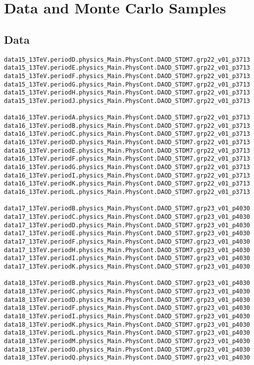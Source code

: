 \section{Data and Monte Carlo Samples}
\label{app:datasets}

\subsection{Data}
\begin{tiny}
\begin{verbatim}
data15_13TeV.periodD.physics_Main.PhysCont.DAOD_STDM7.grp22_v01_p3713
data15_13TeV.periodE.physics_Main.PhysCont.DAOD_STDM7.grp22_v01_p3713
data15_13TeV.periodF.physics_Main.PhysCont.DAOD_STDM7.grp22_v01_p3713
data15_13TeV.periodG.physics_Main.PhysCont.DAOD_STDM7.grp22_v01_p3713
data15_13TeV.periodH.physics_Main.PhysCont.DAOD_STDM7.grp22_v01_p3713
data15_13TeV.periodJ.physics_Main.PhysCont.DAOD_STDM7.grp22_v01_p3713

data16_13TeV.periodA.physics_Main.PhysCont.DAOD_STDM7.grp22_v01_p3713
data16_13TeV.periodB.physics_Main.PhysCont.DAOD_STDM7.grp22_v01_p3713
data16_13TeV.periodC.physics_Main.PhysCont.DAOD_STDM7.grp22_v01_p3713
data16_13TeV.periodD.physics_Main.PhysCont.DAOD_STDM7.grp22_v01_p3713
data16_13TeV.periodE.physics_Main.PhysCont.DAOD_STDM7.grp22_v01_p3713
data16_13TeV.periodF.physics_Main.PhysCont.DAOD_STDM7.grp22_v01_p3713
data16_13TeV.periodG.physics_Main.PhysCont.DAOD_STDM7.grp22_v01_p3713
data16_13TeV.periodI.physics_Main.PhysCont.DAOD_STDM7.grp22_v01_p3713
data16_13TeV.periodK.physics_Main.PhysCont.DAOD_STDM7.grp22_v01_p3713
data16_13TeV.periodL.physics_Main.PhysCont.DAOD_STDM7.grp22_v01_p3713

data17_13TeV.periodB.physics_Main.PhysCont.DAOD_STDM7.grp23_v01_p4030
data17_13TeV.periodC.physics_Main.PhysCont.DAOD_STDM7.grp23_v01_p4030
data17_13TeV.periodD.physics_Main.PhysCont.DAOD_STDM7.grp23_v01_p4030
data17_13TeV.periodE.physics_Main.PhysCont.DAOD_STDM7.grp23_v01_p4030
data17_13TeV.periodF.physics_Main.PhysCont.DAOD_STDM7.grp23_v01_p4030
data17_13TeV.periodH.physics_Main.PhysCont.DAOD_STDM7.grp23_v01_p4030
data17_13TeV.periodI.physics_Main.PhysCont.DAOD_STDM7.grp23_v01_p4030
data17_13TeV.periodK.physics_Main.PhysCont.DAOD_STDM7.grp23_v01_p4030

data18_13TeV.periodB.physics_Main.PhysCont.DAOD_STDM7.grp23_v01_p4030
data18_13TeV.periodC.physics_Main.PhysCont.DAOD_STDM7.grp23_v01_p4030
data18_13TeV.periodD.physics_Main.PhysCont.DAOD_STDM7.grp23_v01_p4030
data18_13TeV.periodF.physics_Main.PhysCont.DAOD_STDM7.grp23_v01_p4030
data18_13TeV.periodI.physics_Main.PhysCont.DAOD_STDM7.grp23_v01_p4030
data18_13TeV.periodK.physics_Main.PhysCont.DAOD_STDM7.grp23_v01_p4030
data18_13TeV.periodL.physics_Main.PhysCont.DAOD_STDM7.grp23_v01_p4030
data18_13TeV.periodM.physics_Main.PhysCont.DAOD_STDM7.grp23_v01_p4030
data18_13TeV.periodO.physics_Main.PhysCont.DAOD_STDM7.grp23_v01_p4030
data18_13TeV.periodQ.physics_Main.PhysCont.DAOD_STDM7.grp23_v01_p4030

\end{verbatim}
\end{tiny}

